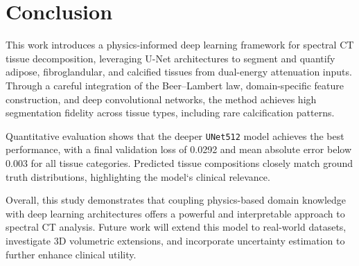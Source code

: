 \section{Conclusion}\label{sec:conclusion}

This work introduces a physics-informed deep learning framework for spectral CT tissue decomposition, leveraging U-Net 
architectures to segment and quantify adipose, fibroglandular, and calcified tissues from dual-energy attenuation inputs. 
Through a careful integration of the Beer–Lambert law, domain-specific feature construction, and deep convolutional 
networks, the method achieves high segmentation fidelity across tissue types, including rare calcification patterns.

Quantitative evaluation shows that the deeper \texttt{UNet512} model achieves the best performance, with a final validation 
loss of 0.0292 and mean absolute error below 0.003 for all tissue categories. Predicted tissue compositions closely match 
ground truth distributions, highlighting the model`s clinical relevance.

Overall, this study demonstrates that coupling physics-based domain knowledge with deep learning architectures offers a 
powerful and interpretable approach to spectral CT analysis. Future work will extend this model to real-world datasets, 
investigate 3D volumetric extensions, and incorporate uncertainty estimation to further enhance clinical utility.
